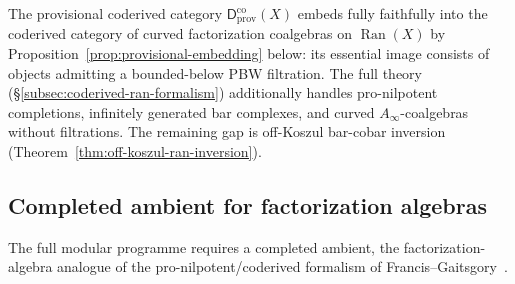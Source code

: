 \begin{remark}
\label{rem:coderived-full}
The provisional coderived category
$\mathsf{D}^{\mathrm{co}}_{\mathrm{prov}}(X)$ embeds fully faithfully
into the coderived category of curved factorization coalgebras on
$\operatorname{Ran}(X)$ by
Proposition~\ref{prop:provisional-embedding} below: its essential
image consists of objects admitting a bounded-below PBW filtration.
The full theory (\S\ref{subsec:coderived-ran-formalism}) additionally
handles pro-nilpotent completions, infinitely generated bar complexes,
and curved $A_\infty$-coalgebras without filtrations.  The remaining
gap is off-Koszul bar-cobar inversion
(Theorem~\ref{thm:off-koszul-ran-inversion}).
\end{remark}

\subsection{Completed ambient for factorization algebras}
\label{subsec:completed-ambient}

The full modular programme requires a completed ambient, the
factorization-algebra analogue of the pro-nilpotent/coderived
formalism of Francis--Gaitsgory~\cite{FG12}.

